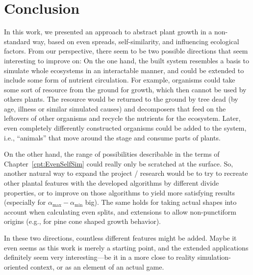 \documentclass[11pt, abstract=on]{scrartcl}
\begin{document}
\section{Conclusion}
In this work, we presented an approach to abstract plant growth in a non-standard way, based on even spreads, self-similarity, and influencing ecological factors. From our perspective, there seem to be two possible directions that seem interesting to improve on: On the one hand, the built system resembles a basis to simulate whole ecosystems in an interactable manner, and could be extended to include some form of nutrient circulation. For example, organisms could take some sort of resource from the ground for growth, which then cannot be used by others plants. The resource would be returned to the ground by tree dead (by age, illness or similar simulated causes) and decomposers that feed on the leftovers of other organisms and recycle the nutrients for the ecosystem. Later, even completely differently constructed organisms could be added to the system, i.e., ``animals'' that move around the stage and consume parts of plants.

On the other hand, the range of possibilities describable in the terms of Chapter~\ref{cpt:EvenSelfSim} could really only be scratched at the surface. So, another natural way to expand the project / research would be to try to recreate other plantal features with the developed algorithms by different divide properties, or to improve on those algorithms to yield more satisfying results (especially for $\alpha_\text{max} - \alpha_\text{min}$ big). The same holds for taking actual shapes into account when calculating even splits, and extensions to allow non-punctiform origins (e.g., for pine cone shaped growth behavior).

In these two directions, countless different features might be added. Maybe it even seems as this work is merely a starting point, and the extended applications definitely seem very interesting---be it in a more close to reality simulation-oriented context, or as an element of an actual game.
\end{document}
